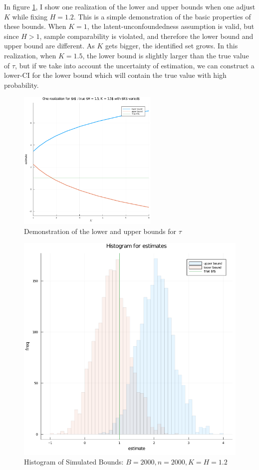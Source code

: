 \documentclass[12pt]{article}
\begin{document}
    In figure \ref{fig:fig1}, I show one realization of the lower and upper bounds when one adjust $K$ while fixing $H = 1.2$. This is a simple demonstration of the basic properties of these bounds. When $K = 1$, the latent-unconfoundedness assumption is valid, but since $H > 1$, sample comparability is violated, and therefore the lower bound and upper bound are different. As $K$ gets bigger, the identified set grows. In this realization, when $K = 1.5$, the lower bound is slightly larger than the true value of $\tau$, but if we take into account the uncertainty of estimation, we can construct a lower-CI for the lower bound which will contain the true value with high probability.    
    
    \begin{figure}[!htbp]
        \centering
        \includegraphics[width=0.6\textwidth]{../code/fig1.png}
        \caption{Demonstration of the lower and upper bounds for $\tau$}
        \label{fig:fig1}
    \end{figure}
    
    \begin{figure}[!htbp]
        \centering
        \includegraphics[width = 0.6 \textwidth]{../code/fig2.png}
        \caption{Histogram of Simulated Bounds: $B = 2000, n = 2000, K = H = 1.2$}
        \label{fig:fig2}
    \end{figure}
    
\end{document}
